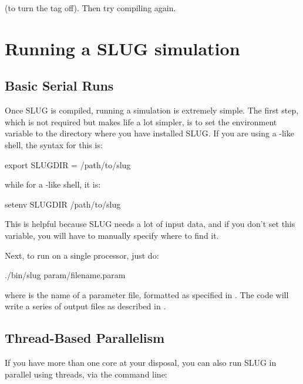 \documentclass[letterpaper,10pt,english]{sphinxmanual}
\begin{document}
(to turn the  tag off). Then try compiling again.


\chapter{Running a SLUG simulation}
\label{\detokenize{running::doc}}\label{\detokenize{running:running-a-slug-simulation}}

\section{Basic Serial Runs}
\label{\detokenize{running:basic-serial-runs}}
Once SLUG is compiled, running a simulation is extremely simple. The first step, which is not required but makes life a lot simpler, is to set the environment variable  to the directory where you have installed SLUG. If you are using a -like shell, the syntax for this is:

\begin{sphinxVerbatim}[commandchars=\\\{\}]
export SLUG\PYGZus{}DIR = /path/to/slug
\end{sphinxVerbatim}

while for a -like shell, it is:

\begin{sphinxVerbatim}[commandchars=\\\{\}]
setenv SLUG\PYGZus{}DIR /path/to/slug
\end{sphinxVerbatim}

This is helpful because SLUG needs a lot of input data, and if you don’t set this variable, you will have to manually specify where to find it.

Next, to run on a single processor, just do:

\begin{sphinxVerbatim}[commandchars=\\\{\}]
./bin/slug param/filename.param
\end{sphinxVerbatim}

where  is the name of a parameter file, formatted as specified in {\hyperref[\detokenize{parameters:sec-parameters}]{}}. The code will write a series of output files as described in {\hyperref[\detokenize{output:sec-output}]{}}.


\section{Thread-Based Parallelism}
\label{\detokenize{running:thread-based-parallelism}}
If you have more than one core at your disposal, you can also run SLUG in parallel using threads, via the command line:
\end{document}
